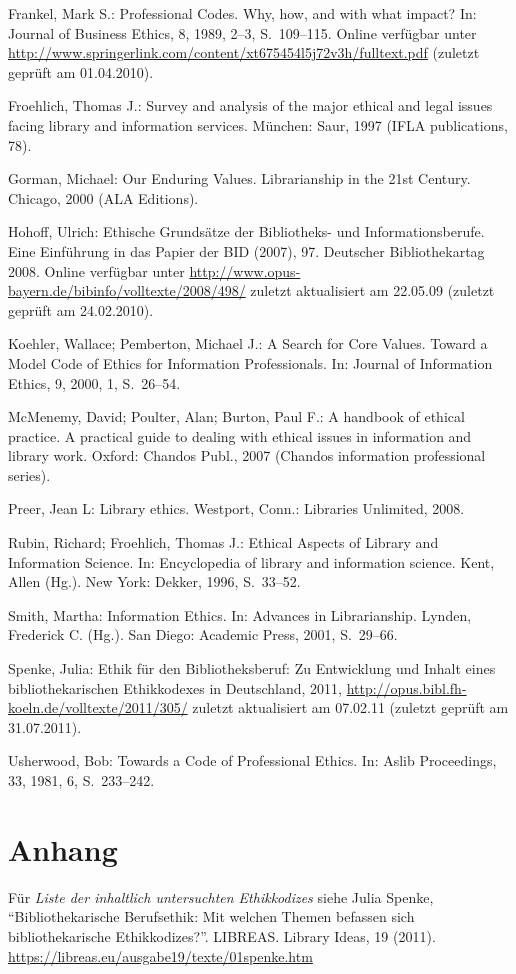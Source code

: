 \documentclass[output=paper]{langscibook}
\begin{document}
Frankel, Mark S.: Professional Codes. Why, how, and with what impact?
In: Journal of Business Ethics, 8, 1989, 2--3, S.~109--115. Online
verfügbar unter
\url{http://www.springerlink.com/content/xt675454l5j72v3h/fulltext.pdf}
(zuletzt geprüft am 01.04.2010).

Froehlich, Thomas J.: Survey and analysis of the major ethical and legal
issues facing library and information services. München: Saur, 1997
(IFLA publications, 78).

Gorman, Michael: Our Enduring Values. Librarianship in the 21st Century.
Chicago, 2000 (ALA Editions).

Hohoff, Ulrich: Ethische Grundsätze der Bibliotheks- und
Informationsberufe. Eine Einführung in das Papier der BID (2007), 97.
Deutscher Bibliothekartag 2008. Online verfügbar unter
\url{http://www.opus-bayern.de/bibinfo/volltexte/2008/498/} zuletzt
aktualisiert am 22.05.09 (zuletzt geprüft am 24.02.2010).

Koehler, Wallace; Pemberton, Michael J.: A Search for Core Values.
Toward a Model Code of Ethics for Information Professionals. In: Journal
of Information Ethics, 9, 2000, 1, S.~26--54.

McMenemy, David; Poulter, Alan; Burton, Paul F.: A handbook of ethical
practice. A practical guide to dealing with ethical issues in
information and library work. Oxford: Chandos Publ., 2007 (Chandos
information professional series).

Preer, Jean L: Library ethics. Westport, Conn.: Libraries Unlimited,
2008.

Rubin, Richard; Froehlich, Thomas J.: Ethical Aspects of Library and
Information Science. In: Encyclopedia of library and information
science. Kent, Allen (Hg.). New York: Dekker, 1996, S.~33--52.

Smith, Martha: Information Ethics. In: Advances in Librarianship.
Lynden, Frederick C. (Hg.). San Diego: Academic Press, 2001, S.~29--66.

Spenke, Julia: Ethik für den Bibliotheksberuf: Zu Entwicklung und Inhalt
eines bibliothekarischen Ethikkodexes in Deutschland, 2011,
\url{http://opus.bibl.fh-koeln.de/volltexte/2011/305/} zuletzt
aktualisiert am 07.02.11 (zuletzt geprüft am 31.07.2011).

Usherwood, Bob: Towards a Code of Professional Ethics. In: Aslib
Proceedings, 33, 1981, 6, S.~233--242.

\hypertarget{anhang}{%
\section*{Anhang}\label{anhang}}

Für \emph{Liste der inhaltlich untersuchten Ethikkodizes} siehe Julia
Spenke, \enquote{Bibliothekarische Berufsethik: Mit welchen Themen
befassen sich bibliothekarische Ethikkodizes?}. LIBREAS. Library Ideas,
19 (2011). \url{https://libreas.eu/ausgabe19/texte/01spenke.htm}
\end{document}
